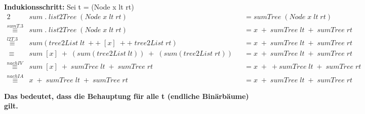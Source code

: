 \documentclass[11pt]{article}
\begin{document}
\begin{enumerate}
\textbf{Indukionsschritt:} Sei t = (Node x lt rt)
\begin{alignat*}{2}
&sum\phantom{.}.\phantom{.}list2Tree\phantom{.}(Node\phantom{.}x\phantom{.}lt\phantom{.}rt)&&=sumTree\phantom{.}(Node\phantom{.}x\phantom{.}lt\phantom{.}rt)\\
\stackrel{sumT.3}{\equiv}&sum\phantom{.}.\phantom{.}list2Tree\phantom{.}(Node\phantom{.}x\phantom{.}lt\phantom{.}rt)&&=x\phantom{.}+\phantom{.}sumTree\phantom{.}lt\phantom{.}+\phantom{.}sumTree\phantom{.}rt\\
\stackrel{l2T.3}{\equiv}&sum(tree2List\phantom{.}lt\phantom{.}++\phantom{.}[x]\phantom{.}++\phantom{.}tree2List\phantom{.}rt)&&=x\phantom{.}+\phantom{.}sumTree\phantom{.}lt\phantom{.}+\phantom{.}sumTree\phantom{.}rt\\
\equiv\phantom{.}&sum\phantom{.}[x]\phantom{.}+\phantom{.}(sum(tree2List\phantom{.}lt))\phantom{.}+\phantom{.}(sum(tree2List\phantom{.}rt))&&=x\phantom{.}+\phantom{.}sumTree\phantom{.}lt\phantom{.}+\phantom{.}sumTree\phantom{.}rt\\
\stackrel{nach IV}{\equiv}&sum\phantom{.}[x]\phantom{.}+\phantom{.}sumTree\phantom{.}lt\phantom{.}+\phantom{.}sumTree\phantom{.}rt&&=x\phantom{.}+\phantom{.}+sumTree\phantom{.}lt\phantom{.}+\phantom{.}sumTree\phantom{.}rt\\
\stackrel{nach IA}{\equiv}&x\phantom{.}+\phantom{.}sumTree\phantom{.}lt\phantom{.}+\phantom{.}sumTree\phantom{.}rt&&=x\phantom{.}+\phantom{.}sumTree\phantom{.}lt\phantom{.}+\phantom{.}sumTree\phantom{.}rt
\end{alignat*}

\vspace*{0.5cm}
\textbf{Das bedeutet, dass die Behauptung für alle t (endliche Binärbäume) gilt.}
\end{enumerate}
\end{document}
